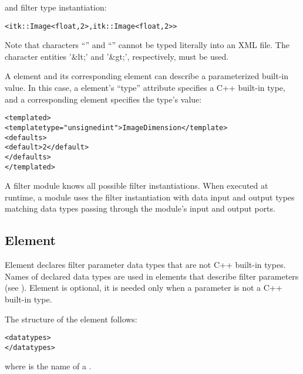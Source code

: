 and filter type instantiation:

\begin{alltt}
  <itk::Image<float,2>,itk::Image<float,2> >
\end{alltt}

Note that characters ``\la'' and ``\ra'' cannot be typed literally into an
XML file. The character entities '\&lt;' and '\&gt;', respectively, 
must be used.

A  element and its corresponding
 element can describe a parameterized built-in 
value.  In this case, a  element's ``type''
attribute specifies a C++ built-in type, and a corresponding
 element specifies the type's value:

\begin{alltt}
  <templated>
    <template type="unsigned int">ImageDimension</template>
    \velide
    <defaults>
      <default>2</default>
      \velide
    </defaults>
  </templated>
\end{alltt}

A \sr{} filter module knows all possible filter instantiations.  When
executed at runtime, a module uses the filter instantiation with data
input and output types matching data types passing through the
module's input and output ports.

\subsection{Element }

Element  declares filter parameter data types
that are not C++ built-in  types.  Names of declared data types are
used in  elements that describe filter
parameters (see ).  Element
 is optional, it is needed only when a
parameter is not a C++ built-in type.

The structure of the  element follows:

\begin{alltt}
  <datatypes>
    \velide
    \velide  
  </datatypes>
\end{alltt}

where  is the name of a .  

